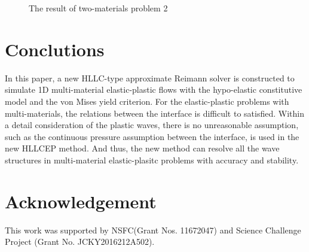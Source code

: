 \documentclass{article}
\numberwithin{equation}{section}
\numberwithin{table}{section}
\begin{document}
\begin{figure}
	  \caption{ The result of two-materials  problem 2}
	  \label{fig:multi2}
	\end{figure}

\section*{Conclutions}
In this paper, a new HLLC-type approximate Reimann solver is constructed to simulate 1D multi-material elastic-plastic flows with the hypo-elastic constitutive model and the von Mises yield criterion. For the elastic-plastic problems with multi-materials, the relations between the interface is difficult to satisfied.  Within  a detail consideration of the plastic waves, there is no unreasonable assumption,  such as  the continuous pressure assumption between the interface, is used in the new HLLCEP method. And thus, the new method can resolve all the  wave structures in multi-material elastic-plasitc problems with accuracy and stability.










%
\section*{Acknowledgement}
This work was supported by NSFC(Grant Nos. 11672047) and Science Challenge Project (Grant No. JCKY2016212A502).






\newpage
  \appendix
  \renewcommand{\appendixname}{Appendix~}
\end{document}
